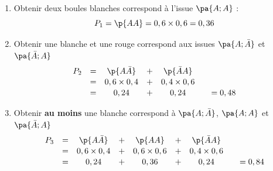 \begin{methode}
\begin{correction}
		\begin{enumerate}
			\item Obtenir deux boules blanches correspond à l'issue $\pa{A ;A}$ :
			      \[
				      P_1 = \p{AA} = 0,6 \times 0,6 = 0,36
			      \]
			\item Obtenir une blanche et une rouge correspond aux issues $\pa{ A ; \bar{A} }$ et $\pa{\bar{A} ;A}$
			      \[
				      \def\arraystretch{1.1}
				      \begin{array}{rccccr}
					      P_2 & = & \p{A\bar{A}}  & + & \p{\bar{A}A}  & ~          \\
					      ~   & = & 0,6\times 0,4 & + & 0,4\times 0,6 & ~          \\
					      ~   & = & 0,24          & + & 0,24          & \quad=0,48
				      \end{array}
			      \]

			\item Obtenir \textbf{au moins} une blanche correspond à $\pa{A;\bar{A}}$, $\pa{A;A}$ et $\pa{\bar{A} ;A}$
			      \[
				      \def\arraystretch{1.1}
				      \begin{array}{rccccccr}
					      P_3 & = & \p{A\bar{A}}  & + & \p{AA}        & + & \p{\bar{A}A}  & ~          \\
					      ~   & = & 0,6\times 0,4 & + & 0,6\times 0,6 & + & 0,4\times 0,6 & ~          \\
					      ~   & = & 0,24          & + & 0,36          & + & 0,24          & \quad=0,84
				      \end{array}
			      \]
		\end{enumerate}


\end{correction}
\end{methode}
